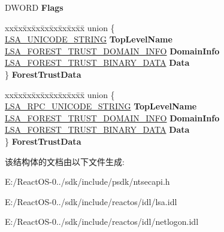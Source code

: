 \begin{DoxyCompactItemize}
\begin{tabbing}
\end{tabbing}\item 
\mbox{\label{struct___l_s_a___f_o_r_e_s_t___t_r_u_s_t___r_e_c_o_r_d_a48c7b187f24489e5d2176a07dccb51c0}} 
D\+W\+O\+RD {\bfseries Flags}
\item 
\mbox{\label{struct___l_s_a___f_o_r_e_s_t___t_r_u_s_t___r_e_c_o_r_d_a3b71f8cb403f708cb0904ff0680c8e09}} 
\begin{tabbing}
xx\=xx\=xx\=xx\=xx\=xx\=xx\=xx\=xx\=\kill
union \{\\
\>\hyperlink{struct___l_s_a___u_n_i_c_o_d_e___s_t_r_i_n_g}{LSA\_UNICODE\_STRING} {\bfseries TopLevelName}\\
\>\hyperlink{struct___l_s_a___f_o_r_e_s_t___t_r_u_s_t___d_o_m_a_i_n___i_n_f_o}{LSA\_FOREST\_TRUST\_DOMAIN\_INFO} {\bfseries DomainInfo}\\
\>\hyperlink{struct___l_s_a___f_o_r_e_s_t___t_r_u_s_t___b_i_n_a_r_y___d_a_t_a}{LSA\_FOREST\_TRUST\_BINARY\_DATA} {\bfseries Data}\\
\} {\bfseries ForestTrustData}\\

\end{tabbing}\item 
\mbox{\label{struct___l_s_a___f_o_r_e_s_t___t_r_u_s_t___r_e_c_o_r_d_af1532479fdb1c51ae9690343674fa1fa}} 
\begin{tabbing}
xx\=xx\=xx\=xx\=xx\=xx\=xx\=xx\=xx\=\kill
union \{\\
\>\hyperlink{struct___r_p_c___u_n_i_c_o_d_e___s_t_r_i_n_g}{LSA\_RPC\_UNICODE\_STRING} {\bfseries TopLevelName}\\
\>\hyperlink{struct___l_s_a___f_o_r_e_s_t___t_r_u_s_t___d_o_m_a_i_n___i_n_f_o}{LSA\_FOREST\_TRUST\_DOMAIN\_INFO} {\bfseries DomainInfo}\\
\>\hyperlink{struct___l_s_a___f_o_r_e_s_t___t_r_u_s_t___b_i_n_a_r_y___d_a_t_a}{LSA\_FOREST\_TRUST\_BINARY\_DATA} {\bfseries Data}\\
\} {\bfseries ForestTrustData}\\

\end{tabbing}\end{DoxyCompactItemize}


该结构体的文档由以下文件生成\+:\begin{DoxyCompactItemize}
\item 
E\+:/\+React\+O\+S-\/0../sdk/include/psdk/ntsecapi.\+h\item 
E\+:/\+React\+O\+S-\/0../sdk/include/reactos/idl/lsa.\+idl\item 
E\+:/\+React\+O\+S-\/0../sdk/include/reactos/idl/netlogon.\+idl\end{DoxyCompactItemize}

